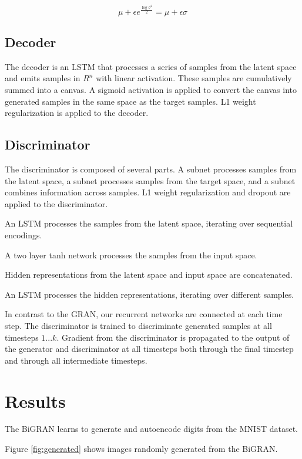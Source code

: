 \documentclass{article}
\begin{document}
$$\mu + \epsilon e^{\frac{\log \sigma^2}{2}} = \mu + \epsilon \sigma$$

\subsection{Decoder}
 
The decoder is an LSTM that processes a series of samples from the latent space and emits samples in $R^n$ with linear activation. These samples are cumulatively summed into a canvas. A sigmoid activation is applied to convert the canvas into generated samples in the same space as the target samples. L1 weight regularization is applied to the decoder.

\subsection{Discriminator}

The discriminator is composed of several parts. A subnet processes samples from the latent space, a subnet processes samples from the target space, and a subnet combines information across samples. L1 weight regularization and dropout are applied to the discriminator.

An LSTM processes the samples from the latent space, iterating over sequential encodings.

A two layer tanh network processes the samples from the input space.

Hidden representations from the latent space and input space are concatenated.

An LSTM processes the hidden representations, iterating over different samples.
 
In contrast to the GRAN, our recurrent networks are connected at each time step. The discriminator is trained to discriminate generated samples at all timesteps $1...k$. Gradient from the discriminator is propagated to the output of the generator and discriminator at all timesteps both through the final timestep and through all intermediate timesteps.

\section{Results}

The BiGRAN learns to generate and autoencode digits from the MNIST dataset. 

Figure \ref{fig:generated} shows images randomly generated from the BiGRAN.
 
\end{document}
